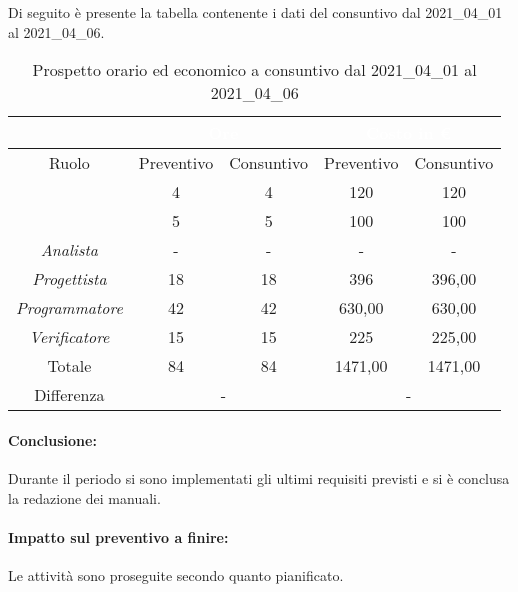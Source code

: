 Di seguito è presente la tabella contenente i dati del consuntivo dal 2021\_04\_01 al 2021\_04\_06.
\begin{table}[H]
	\centering
	\begin{tabular}{|c|c|c|c|c|}
		\rowcolor{darkblue} 
		&\multicolumn{2}{c|}{\textcolor{white}{Ore}}&\multicolumn{2}{c|}{\textcolor{white}{Costo in €}}\\ \hline
		Ruolo			&	Preventivo				&	Consuntivo		&	Preventivo	&	Consuntivo\\ \hline
		{\Responsabile}		&	4					&	4				&	120			&	120 \\ \hline
		{\Amministratore}	&	5					&	5				&	100			&	100 \\ \hline
		\textit{Analista}	&	-					&	-				&	-			&	- \\ \hline
		\textit{Progettista}& 	18					&   18 				& 	396			&  	396,00 \\ \hline
		\textit{Programmatore}& 42					& 	42				& 	630,00			&  	630,00 \\ \hline
		\textit{Verificatore}&	15					&	15				&	225			&	225,00 \\ \hline
		Totale				&	84					&	84				&	1471,00			&	1471,00 \\ \hline
		Differenza			& 	\multicolumn{2}{c|}{-} 				&\multicolumn{2}{c|}{-}\\ \hline
	\end{tabular}
	\caption{Prospetto orario ed economico a consuntivo dal 2021\_04\_01 al 2021\_04\_06}
\end{table}
\paragraph*{Conclusione:}
Durante il periodo si sono implementati gli ultimi requisiti previsti e si è conclusa la redazione dei manuali.
\paragraph*{Impatto sul preventivo a finire:}
Le attività sono proseguite secondo quanto pianificato.
